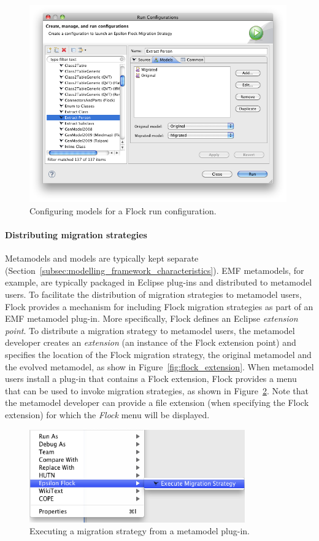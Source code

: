 \begin{figure}[tbp]
	\centering
		\includegraphics[height=8.5cm]{5.Implementation/images/flock_programmers_guide/new_launch_config_models.png}
	\caption{Configuring models for a Flock run configuration.}
	\label{fig:flock_new_launch_config_models}
\end{figure}

\paragraph{Distributing migration strategies} Metamodels and models are typically kept separate (Section~\ref{subsec:modelling_framework_characteristics}). EMF metamodels, for example, are typically packaged in Eclipse plug-ins and distributed to metamodel users. To facilitate the distribution of migration strategies to metamodel users, Flock provides a mechanism for including Flock migration strategies as part of an EMF metamodel plug-in. More specifically, Flock defines an Eclipse \emph{extension point}. To distribute a migration strategy to metamodel users, the metamodel developer creates an \emph{extension} (an instance of the Flock extension point) and specifies the location of the Flock migration strategy, the original metamodel and the evolved metamodel, as show in Figure~\ref{fig:flock_extension}. When metamodel users install a plug-in that contains a Flock extension, Flock provides a menu that can be used to invoke migration strategies, as shown in Figure~\ref{fig:flock_extension_execution}. Note that the metamodel developer can provide a file extension (when specifying the Flock extension) for which the \emph{Flock} menu will be displayed.

\begin{figure}[tbp]
	\centering
		\includegraphics[height=4cm]{5.Implementation/images/flock_programmers_guide/extension_execution.png}
	\caption{Executing a migration strategy from a metamodel plug-in.}
	\label{fig:flock_extension_execution}
\end{figure}

